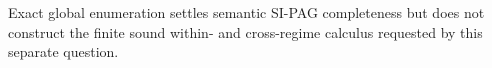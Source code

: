 Exact global enumeration settles semantic SI-PAG completeness but does not construct the finite sound within- and cross-regime calculus requested by this separate question.